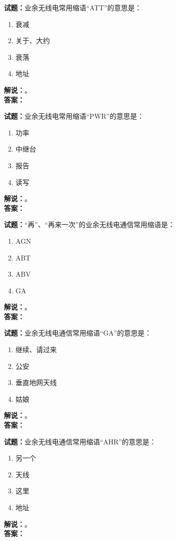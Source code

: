 \documentclass{ctexbook}
\begin{document}
\bigskip

\noindent\textbf{试题：}业余无线电常用缩语“ATT”的意思是：
\begin{enumerate}[leftmargin=3em]
  \item 衰减
  \item 关于、大约
  \item 衰落
  \item 地址
\end{enumerate}
\noindent\textbf{解说：}\textbf{}。\\\noindent\textbf{答案：}

\bigskip

\noindent\textbf{试题：}业余无线电常用缩语“PWR”的意思是：
\begin{enumerate}[leftmargin=3em]
  \item 功率
  \item 中继台
  \item 报告
  \item 读写
\end{enumerate}
\noindent\textbf{解说：}\textbf{}。\\\noindent\textbf{答案：}

\bigskip

\noindent\textbf{试题：}“再”、“再来一次”的业余无线电通信常用缩语是：
\begin{enumerate}[leftmargin=3em]
  \item AGN
  \item ABT
  \item ABV
  \item GA
\end{enumerate}
\noindent\textbf{解说：}\textbf{}。\\\noindent\textbf{答案：}

\bigskip

\noindent\textbf{试题：}业余无线电通信常用缩语“GA”的意思是：
\begin{enumerate}[leftmargin=3em]
  \item 继续、请过来
  \item 公安
  \item 垂直地网天线
  \item 姑娘
\end{enumerate}
\noindent\textbf{解说：}\textbf{}。\\\noindent\textbf{答案：}

\bigskip

\noindent\textbf{试题：}业余无线电通信常用缩语“AHR”的意思是：
\begin{enumerate}[leftmargin=3em]
  \item 另一个
  \item 天线
  \item 这里
  \item 地址
\end{enumerate}
\noindent\textbf{解说：}\textbf{}。\\\noindent\textbf{答案：}
\end{document}
